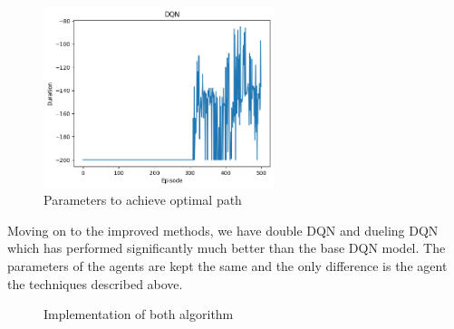 \documentclass{article}
\begin{document}
\begin{figure}[h]
    \centering
    \includegraphics[width=0.6\textwidth]{dqn.png}
    \caption{Parameters to achieve optimal path}
\end{figure}

\newpage

Moving on to the improved methods, we have double DQN and dueling DQN which has
performed significantly much better than the base DQN model. The parameters of
the agents are kept the same and the only difference is the agent the techniques
described above.

\begin{figure}[h]%
    \centering
    \qquad
    \caption{Implementation of both algorithm}%
    \label{fig:example}%
\end{figure}
\end{document}
